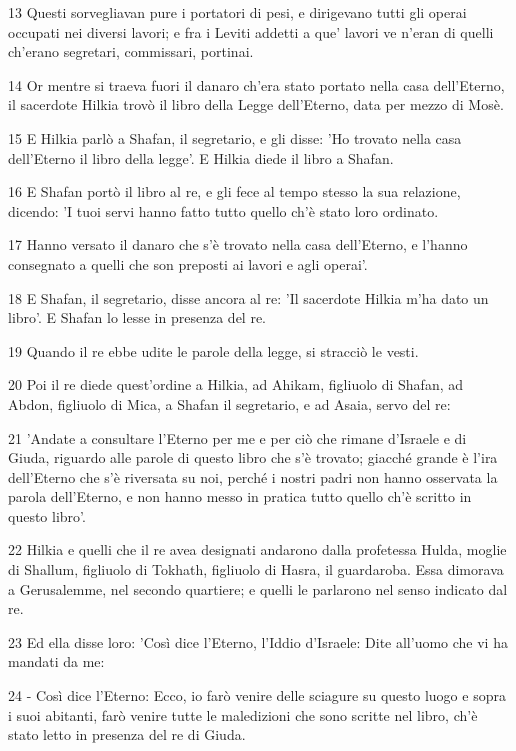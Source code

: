 \par 13 Questi sorvegliavan pure i portatori di pesi, e dirigevano tutti gli operai occupati nei diversi lavori; e fra i Leviti addetti a que' lavori ve n'eran di quelli ch'erano segretari, commissari, portinai.
\par 14 Or mentre si traeva fuori il danaro ch'era stato portato nella casa dell'Eterno, il sacerdote Hilkia trovò il libro della Legge dell'Eterno, data per mezzo di Mosè.
\par 15 E Hilkia parlò a Shafan, il segretario, e gli disse: 'Ho trovato nella casa dell'Eterno il libro della legge'. E Hilkia diede il libro a Shafan.
\par 16 E Shafan portò il libro al re, e gli fece al tempo stesso la sua relazione, dicendo: 'I tuoi servi hanno fatto tutto quello ch'è stato loro ordinato.
\par 17 Hanno versato il danaro che s'è trovato nella casa dell'Eterno, e l'hanno consegnato a quelli che son preposti ai lavori e agli operai'.
\par 18 E Shafan, il segretario, disse ancora al re: 'Il sacerdote Hilkia m'ha dato un libro'. E Shafan lo lesse in presenza del re.
\par 19 Quando il re ebbe udite le parole della legge, si stracciò le vesti.
\par 20 Poi il re diede quest'ordine a Hilkia, ad Ahikam, figliuolo di Shafan, ad Abdon, figliuolo di Mica, a Shafan il segretario, e ad Asaia, servo del re:
\par 21 'Andate a consultare l'Eterno per me e per ciò che rimane d'Israele e di Giuda, riguardo alle parole di questo libro che s'è trovato; giacché grande è l'ira dell'Eterno che s'è riversata su noi, perché i nostri padri non hanno osservata la parola dell'Eterno, e non hanno messo in pratica tutto quello ch'è scritto in questo libro'.
\par 22 Hilkia e quelli che il re avea designati andarono dalla profetessa Hulda, moglie di Shallum, figliuolo di Tokhath, figliuolo di Hasra, il guardaroba. Essa dimorava a Gerusalemme, nel secondo quartiere; e quelli le parlarono nel senso indicato dal re.
\par 23 Ed ella disse loro: 'Così dice l'Eterno, l'Iddio d'Israele: Dite all'uomo che vi ha mandati da me:
\par 24 - Così dice l'Eterno: Ecco, io farò venire delle sciagure su questo luogo e sopra i suoi abitanti, farò venire tutte le maledizioni che sono scritte nel libro, ch'è stato letto in presenza del re di Giuda.
